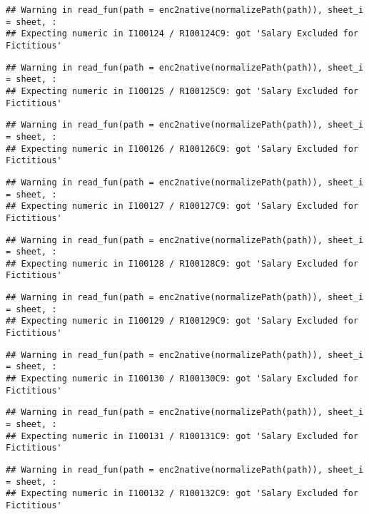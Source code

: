 \documentclass[
]{article}
\begin{document}
\begin{verbatim}
## Warning in read_fun(path = enc2native(normalizePath(path)), sheet_i = sheet, :
## Expecting numeric in I100124 / R100124C9: got 'Salary Excluded for Fictitious'
\end{verbatim}

\begin{verbatim}
## Warning in read_fun(path = enc2native(normalizePath(path)), sheet_i = sheet, :
## Expecting numeric in I100125 / R100125C9: got 'Salary Excluded for Fictitious'
\end{verbatim}

\begin{verbatim}
## Warning in read_fun(path = enc2native(normalizePath(path)), sheet_i = sheet, :
## Expecting numeric in I100126 / R100126C9: got 'Salary Excluded for Fictitious'
\end{verbatim}

\begin{verbatim}
## Warning in read_fun(path = enc2native(normalizePath(path)), sheet_i = sheet, :
## Expecting numeric in I100127 / R100127C9: got 'Salary Excluded for Fictitious'
\end{verbatim}

\begin{verbatim}
## Warning in read_fun(path = enc2native(normalizePath(path)), sheet_i = sheet, :
## Expecting numeric in I100128 / R100128C9: got 'Salary Excluded for Fictitious'
\end{verbatim}

\begin{verbatim}
## Warning in read_fun(path = enc2native(normalizePath(path)), sheet_i = sheet, :
## Expecting numeric in I100129 / R100129C9: got 'Salary Excluded for Fictitious'
\end{verbatim}

\begin{verbatim}
## Warning in read_fun(path = enc2native(normalizePath(path)), sheet_i = sheet, :
## Expecting numeric in I100130 / R100130C9: got 'Salary Excluded for Fictitious'
\end{verbatim}

\begin{verbatim}
## Warning in read_fun(path = enc2native(normalizePath(path)), sheet_i = sheet, :
## Expecting numeric in I100131 / R100131C9: got 'Salary Excluded for Fictitious'
\end{verbatim}

\begin{verbatim}
## Warning in read_fun(path = enc2native(normalizePath(path)), sheet_i = sheet, :
## Expecting numeric in I100132 / R100132C9: got 'Salary Excluded for Fictitious'
\end{verbatim}
\end{document}
